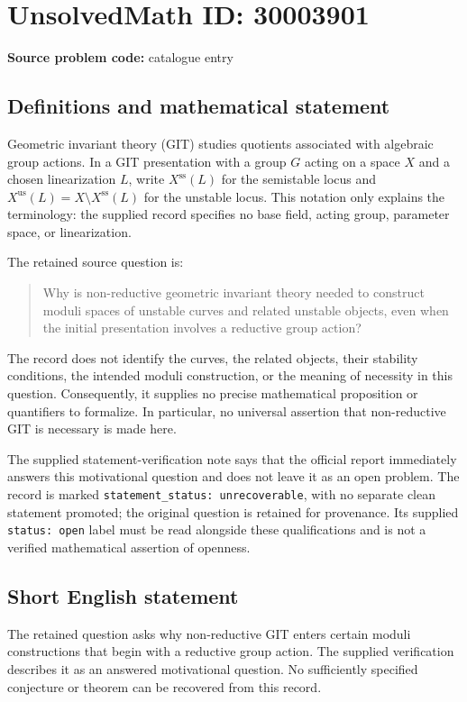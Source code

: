 \documentclass[11pt]{article}
\begin{document}
\section*{UnsolvedMath ID: 30003901}
\textbf{Source problem code:} catalogue entry
\subsection{Definitions and mathematical statement}
Geometric invariant theory (GIT) studies quotients associated with algebraic group actions. In a GIT presentation with a group \(G\) acting on a space \(X\) and a chosen linearization \(L\), write \(X^{\mathrm{ss}}(L)\) for the semistable locus and \(X^{\mathrm{us}}(L)=X\setminus X^{\mathrm{ss}}(L)\) for the unstable locus. This notation only explains the terminology: the supplied record specifies no base field, acting group, parameter space, or linearization.

The retained source question is:
\begin{quote}
Why is non-reductive geometric invariant theory needed to construct moduli spaces of unstable curves and related unstable objects, even when the initial presentation involves a reductive group action?
\end{quote}
The record does not identify the curves, the related objects, their stability conditions, the intended moduli construction, or the meaning of necessity in this question. Consequently, it supplies no precise mathematical proposition or quantifiers to formalize. In particular, no universal assertion that non-reductive GIT is necessary is made here.

The supplied statement-verification note says that the official report immediately answers this motivational question and does not leave it as an open problem. The record is marked \texttt{statement\_status: unrecoverable}, with no separate clean statement promoted; the original question is retained for provenance. Its supplied \texttt{status: open} label must be read alongside these qualifications and is not a verified mathematical assertion of openness.
\subsection{Short English statement}
The retained question asks why non-reductive GIT enters certain moduli constructions that begin with a reductive group action. The supplied verification describes it as an answered motivational question. No sufficiently specified conjecture or theorem can be recovered from this record.
\end{document}
